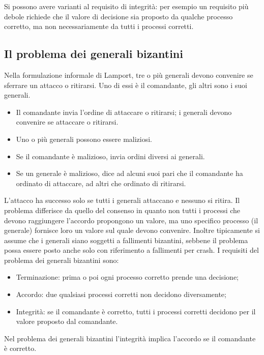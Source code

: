Si possono avere varianti al requisito di integrità: per esempio un requisito più debole richiede che il valore di decisione sia proposto da qualche processo corretto, ma non necessariamente da tutti i processi corretti.

\subsection{Il problema dei generali bizantini}
Nella formulazione informale di Lamport, tre o più generali devono convenire se sferrare un attacco o ritirarsi. Uno di essi è il comandante, gli altri sono i suoi generali.
\begin{itemize}
    \item Il comandante invia l'ordine di attaccare o ritirarsi; i generali devono convenire se attaccare o ritirarsi.
    \item Uno o più generali possono essere maliziosi.
    \item Se il comandante è malizioso, invia ordini diversi ai generali.
    \item Se un generale è malizioso, dice ad alcuni suoi pari che il comandante ha ordinato di attaccare, ad altri che ordinato di ritirarsi.
\end{itemize}

L'attacco ha successo solo se tutti i generali attaccano e nessuno si ritira. Il problema differisce da quello del consenso in quanto non tutti i processi che devono raggiungere l'accordo propongono un valore, ma uno specifico processo (il generale) fornisce loro un valore sul quale devono convenire. Inoltre tipicamente si assume che i generali siano soggetti a fallimenti bizantini, sebbene il problema possa essere posto anche solo con riferimento a fallimenti per crash. \newline
I requisiti del problema dei generali bizantini sono:
\begin{itemize}
    \item Terminazione: prima o poi ogni processo corretto prende una decisione;
    \item Accordo: due qualsiasi processi corretti non decidono diversamente;
    \item Integrità: se il comandante è corretto, tutti i processi corretti decidono per il valore proposto dal comandante.
\end{itemize}

Nel problema dei generali bizantini l'integrità implica l'accordo se il comandante è corretto. 
